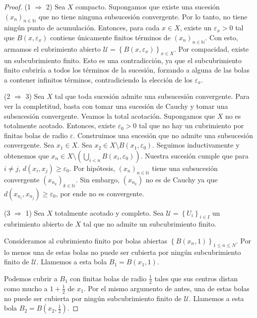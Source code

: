 \begin{proof}
	(1 $\Rightarrow$ 2) Sea $X$ compacto. Supongamos que existe una sucesión $(x_n)_{n \in \mathbb{N}}$ que no tiene ninguna subsucesión convergente. Por lo tanto, no tiene ningún punto de acumulación. Entonces, para cada $x \in X$, existe un $\varepsilon_x > 0$ tal que $B(x, \varepsilon_x)$ contiene únicamente finitos términos de $(x_n)_{n \in \mathbb{N}}$. Con esto, armamos el cubrimiento abierto $\mathcal{U} = \left\{ B(x, \varepsilon_x) \right\}_{x \in X}$. Por compacidad, existe un subcubrimiento finito. Esto es una contradicción, ya que el subcubrimiento finito cubriría a todos los términos de la sucesión, forzando a alguna de las bolas a contener infinitos términos, contradiciendo la elección de los $\varepsilon_x$.

	(2 $\Rightarrow$ 3) Sea $X$ tal que toda sucesión admite una subsucesión convergente. Para ver la completitud, basta con tomar una sucesión de Cauchy y tomar una subsucesión convergente.
	Veamos la total acotación. Supongamos que $X$ no es totalmente acotado. Entonces, existe $\varepsilon_0 > 0$ tal que no hay un cubrimiento por finitas bolas de radio $\varepsilon$. Construimos una sucesión que no admite una subsucesión convergente. Sea $x_1 \in X$. Sea $x_2 \in X \setminus B(x_1, \varepsilon_0)$. Seguimos inductivamente y obtenemos que $x_n \in X \setminus \left( \bigcup_{i < n} B(x_i, \varepsilon_0)\right)$. Nuestra sucesión cumple que para $i \neq j$, $d(x_i, x_j) \geq \varepsilon_0$. Por hipótesis, $(x_n)_{n \in \mathbb{N}}$ tiene una subsucesión convergente $(x_{n_k})_{k \in \mathbb{N}}$. Sin embargo, $(x_{n_k})$ no es de Cauchy ya que $d(x_{n_{i}}, x_{n_j}) \geq \varepsilon_0$, por ende no es convergente.

	(3 $\Rightarrow$ 1) Sea $X$ totalmente acotado y completo. Sea $\mathcal{U} = \left\{ U_i \right\}_{i \in I}$ un cubrimiento abierto de $X$ tal que no admite un subcubrimiento finito.

	Consideramos al cubrimiento finito por bolas abiertas $\left\{ B(x_n, 1) \right\}_{1 \leq n \leq N}$. Por lo menos una de estas bolas no puede ser cubierta por ningún subcubrimiento finito de $\mathcal{U}$. Llamemos a esta bola $B_1 = B(x_1, 1)$.

	Podemos cubrir a $B_1$ con finitas bolas de radio $\frac{1}{2}$ tales que sus centros distan como mucho a $1 + \frac{1}{2}$ de $x_1$. Por el mismo argumento de antes, una de estas bolas no puede ser cubierta por ningún subcubrimiento finito de $\mathcal{U}$. Llamemos a esta bola $B_2 = B(x_2, \frac{1}{2})$.


\end{proof}

